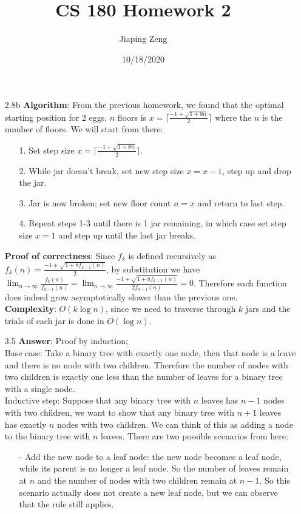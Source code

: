 \documentclass{article}
\title{CS 180 Homework 2}
\date{10/18/2020}
\author{Jiaping Zeng}
\begin{document}

\begin{itemize}
    \item [2.8b]
          \textbf{Algorithm}: From the previous homework, we found that the optimal starting position for 2 eggs, $n$ floors is $x=\lceil\frac{-1+\sqrt{1+8n}}{2}\rceil$ where the $n$ is the number of floors. We will start from there:
          \begin{itemize}
              \item [1.] Set step size $x=\lceil\frac{-1+\sqrt{1+8n}}{2}\rceil$.
              \item [2.] While jar doesn't break, set new step size $x=x-1$, step up and drop the jar.
              \item [3.] Jar is now broken; set new floor count $n=x$ and return to last step.
              \item [4.] Repeat steps 1-3 until there is 1 jar remaining, in which case set step size $x=1$ and step up until the last jar breaks.
          \end{itemize}
          \textbf{Proof of correctness}: Since $f_k$ is defined recursively as $f_k(n)=\frac{-1+\sqrt{1+8f_{k-1}(n)}}{2}$, by substitution we have $\lim_{n\rightarrow\infty}\frac{f_k(n)}{f_{k-1}(n)}=\lim_{n\rightarrow\infty}\frac{-1+\sqrt{1+8f_{k-1}(n)}}{2f_{k-1}(n)}=0$. Therefore each function does indeed grow asymptotically slower than the previous one.\\
          \textbf{Complexity}: $O(k\log n)$, since we need to traverse through $k$ jars and the trials of each jar is done in $O(\log n)$.
    \item [3.5]
          \textbf{Answer}: Proof by induction;\\
          Base case: Take a binary tree with exactly one node, then that node is a leave and there is no node with two children. Therefore the number of nodes with two children is exactly one less than the number of leaves for a binary tree with a single node.\\
          Inductive step: Suppose that any binary tree with $n$ leaves has $n-1$ nodes with two children, we want to show that any binary tree with $n+1$ leaves has exactly $n$ nodes with two children. We can think of this as adding a node to the binary tree with $n$ leaves. There are two possible scenarios from here:
          \begin{itemize}
              \item [-] Add the new node to a leaf node: the new node becomes a leaf node, while its parent is no longer a leaf node. So the number of leaves remain at $n$ and the number of nodes with two children remain at $n-1$. So this scenario actually does not create a new leaf node, but we can observe that the rule still applies.

\end{itemize}
\end{itemize}
\end{document}
